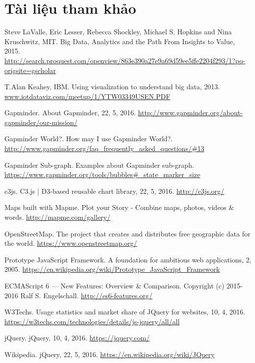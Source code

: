\documentclass[12pt,a4paper]{article}
\begin{document}
\section{Tài liệu tham khảo}
\begin{thebibliography}{}

 Steve LaValle, Eric Lesser, Rebecca Shockley, Michael S. Hopkins and Nina Kruschwitz, MIT. Big Data, Analytics and the Path From Insights to Value, 2015. \url{http://search.proquest.com/openview/863e390a27e9a69d59ee5ffe2204f293/1?pq-origsite=gscholar}

 T.Alan Keahey, IBM. Using visualization to understand big data, 2013. \url{www.iotdataviz.com/meetup/1/YTW03349USEN.PDF}

 Gapminder. About Gapminder, 22, 5, 2016. \url{http://www.gapminder.org/about-gapminder/our-mission/}

 Gapminder World?. How may I use Gapminder World?. \url{http://www.gapminder.org/faq_frequently_asked_questions/#13}

 Gapminder Sub-graph. Examples about Gapminder sub-graph. \url{https://www.gapminder.org/tools/bubbles#_state_marker_size}


 c3js. C3.js | D3-based reusable chart library, 22, 5, 2016. \url{http://c3js.org/}

 Maps built with Mapme. Plot your Story - Combine maps, photos, videos \& words. \url{http://mapme.com/gallery/}

 OpenStreetMap. The project that creates and distributes free geographic data for the world. \url{https://www.openstreetmap.org/}

 Prototype JavaScript Framework. A foundation for ambitious web applications, 2, 2005. \url{https://en.wikipedia.org/wiki/Prototype_JavaScript_Framework}

 ECMAScript 6 — New Features: Overview \& Comparison. Copyright (c) 2015-2016 Ralf S. Engelschall. \url{http://es6-features.org/}

 W3Techs. Usage statistics and market share of JQuery for websites, 10, 4, 2016. \url{https://w3techs.com/technologies/details/js-jquery/all/all}

 jQuery. jQuery, 10, 4, 2016. \url{https://jquery.com/}

 Wikipedia. jQuery, 22, 5, 2016. \url{https://en.wikipedia.org/wiki/JQuery}


\end{thebibliography}
\end{document}

